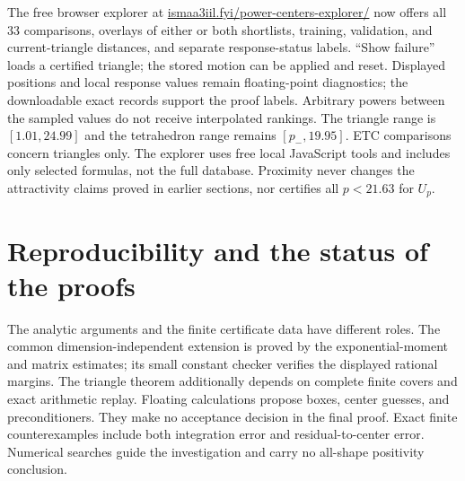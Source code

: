 \documentclass[11pt]{article}
\theoremstyle{definition}
\newcommand{\pn}{p_{-}}
\begin{document}
The free browser explorer at
\href{https://ismaa3iil.fyi/power-centers-explorer/}{ismaa3iil.fyi/power-centers-explorer/}
now offers all $33$ comparisons, overlays of either or both shortlists,
training, validation, and current-triangle distances, and separate
response-status labels. ``Show failure'' loads a certified triangle;
the stored motion can be applied and reset. Displayed positions and
local response values remain floating-point diagnostics; the downloadable
exact records support the proof labels. Arbitrary powers between the
sampled values do not receive interpolated rankings. The triangle range
is $[1.01,24.99]$ and the tetrahedron range remains $[\pn,19.95]$.
ETC comparisons concern triangles only. The explorer uses free local
JavaScript tools and includes only selected formulas, not the full
database. Proximity never changes the attractivity claims proved in
earlier sections, nor certifies all $p<21.63$ for $U_p$.


\section{Reproducibility and the status of the proofs}
The analytic arguments and the finite certificate data have different
roles. The common dimension-independent extension is proved by the
exponential-moment and matrix estimates; its small constant checker verifies
the displayed rational margins. The triangle theorem additionally depends
on complete finite covers and exact arithmetic replay. Floating calculations
propose boxes, center guesses, and preconditioners. They make no acceptance
decision in the final proof. Exact finite counterexamples include both
integration error and residual-to-center error. Numerical searches guide
the investigation and carry no all-shape positivity conclusion.
\end{document}
